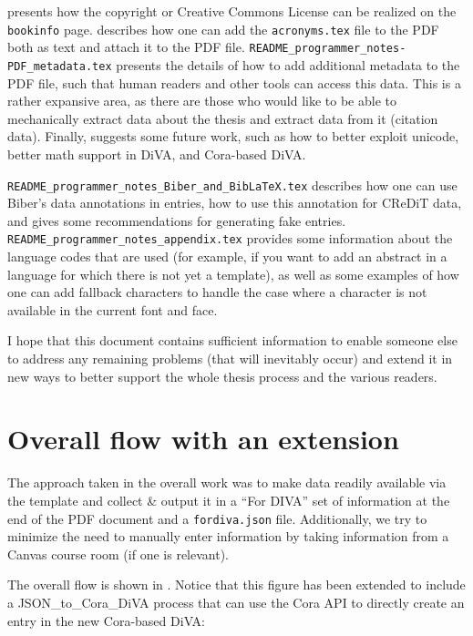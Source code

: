 \documentclass[12pt, twoside]{article}
\newcommand{\fname}[1]{\texttt{#1}}
\begin{document}
 presents how the copyright or Creative Commons License can be realized on the \texttt{bookinfo} page.
 describes how one can add the  \fname{acronyms.tex} file to the \gls{PDF} both as text and attach it to the \gls{PDF} file.
\fname{README\_programmer\_notes-PDF\_metadata.tex} presents the details of how to add additional metadata to the \gls{PDF} file, such that human readers and other tools can access this data. This is a rather expansive area, as there are those who would like to be able to mechanically extract data about the thesis and extract data from it (\eg citation data).
Finally,  suggests some future work, such as how to better exploit unicode, better math support in \gls{DiVA}, and Cora-based \gls{DiVA}.

\fname{README\_programmer\_notes\_Biber\_and\_BibLaTeX.tex} describes how one can use Biber's data annotations in \BibLaTeX{} entries, how to use this annotation for \gls{CReDiT} data, and gives some recommendations for generating fake \BibLaTeX{} entries. \fname{README\_programmer\_notes\_appendix.tex} provides some information about the language codes that are used (for example, if you want to add an abstract in a language for which there is not yet a template), as well as some examples of how one can add fallback characters to handle the case where a character is not available in the current font and face.

I hope that this document contains sufficient information to enable someone else to address any remaining problems (that will inevitably occur) and extend it in new ways to better support the whole thesis process and the various readers.

\section{Overall flow with an extension}
The approach taken in the overall work was to make data readily available via the template and collect \& output it in a 
“For DIVA” set of information at the end of the \gls{PDF} document and a \fname{fordiva.json} file. Additionally, we try to minimize the need to manually enter information by taking information from a Canvas course room (if one is relevant).

The overall flow is shown in . Notice that this figure has been extended to include a JSON\_to\_Cora\_DiVA process that can use the Cora \gls{API} to directly create an entry in the new Cora-based \gls{DiVA}:
\end{document}
